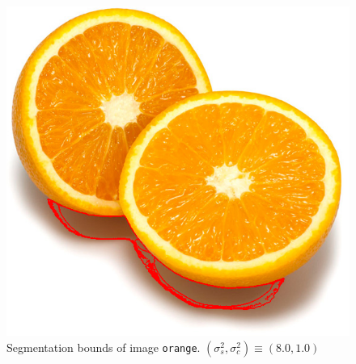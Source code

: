 {\begin{minipage}{\linewidth}
\begin{minipage}{0.45\linewidth}
\begin{figure}[H]
      \includegraphics[scale=0.4]{./images/02/orange/meanshift2_8_1.png}
      \caption{Segmentation bounds of image \texttt{orange}.
        $(\sigma_s^2, \sigma_c^2) \equiv (8.0, 1.0)$}
      \label{fig:02_orange2_8_1}
    \end{figure}
  \end{minipage}
\end{minipage}
}

